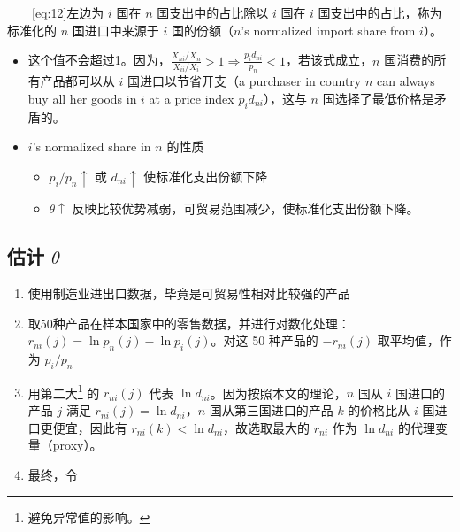 \documentclass[]{article}
\providecommand{\tightlist}{%
  \setlength{\itemsep}{0pt}\setlength{\parskip}{0pt}}
\let\rmarkdownfootnote\footnote%
\def\footnote{\protect\rmarkdownfootnote}
\begin{document}
　　\eqref{eq:12}左边为 \(i\) 国在 \(n\) 国支出中的占比除以 \(i\) 国在 \(i\) 国支出中的占比，称为标准化的 \(n\) 国进口中来源于 \(i\) 国的份额（\(n\)'s normalized import share from \(i\)）。

\begin{itemize}
\tightlist
\item
  这个值不会超过1。因为，\(\frac{X_{n i} / X_{n}}{X_{i i} / X_{i}}>1 \Rightarrow \frac{p_{i} d_{n i}}{p_{n}}<1\)，若该式成立，\(n\) 国消费的所有产品都可以从 \(i\) 国进口以节省开支（a purchaser in country \(n\) can always buy all her goods in \(i\) at a price index \(p_{i} d_{n i}\)），这与 \(n\) 国选择了最低价格是矛盾的。\\
\item
  \(i\)'s normalized share in \(n\) 的性质

  \begin{itemize}
  \tightlist
  \item
    \(p_i/p_n \uparrow\) 或 \(d_{ni} \uparrow\) 使标准化支出份额下降\\
  \item
    \(\theta \uparrow\) 反映比较优势减弱，可贸易范围减少，使标准化支出份额下降。
  \end{itemize}
\end{itemize}

\hypertarget{theta}{%
\subsection{\texorpdfstring{估计 \(\theta\)}{估计 \textbackslash theta}}\label{theta}}

\begin{enumerate}
\def\labelenumi{\arabic{enumi}.}
\tightlist
\item
  使用制造业进出口数据，毕竟是可贸易性相对比较强的产品\\
\item
  取50种产品在样本国家中的零售数据，并进行对数化处理：\(r_{n i}(j)=\ln p_{n}(j)-\ln p_{i}(j)\)。对这 50 种产品的 \(-r_{n i}(j)\) 取平均值，作为 \(p_i/p_n\)\\
\item
  用第二大\footnote{避免异常值的影响。} 的 \(r_{n i}(j)\) 代表 \(\ln d_{ni}\)。因为按照本文的理论，\(n\) 国从 \(i\) 国进口的产品 \(j\) 满足 \(r_{n i}(j)=\ln d_{ni}\)，\(n\) 国从第三国进口的产品 \(k\) 的价格比从 \(i\) 国进口更便宜，因此有 \(r_{n i}(k)<\ln d_{ni}\)，故选取最大的 \(r_{n i}\) 作为 \(\ln d_{ni}\) 的代理变量（proxy）。
\item
  最终，令
\end{enumerate}
\end{document}
